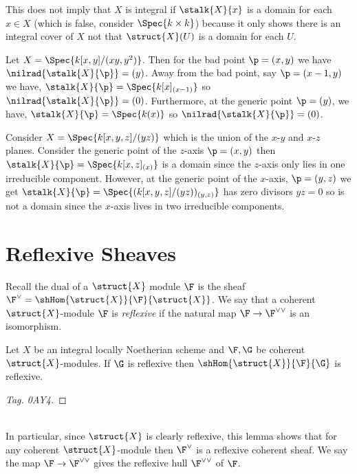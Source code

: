 \documentclass[12pt]{article}
\begin{document}
\begin{rmk}
This does not imply that $X$ is integral if $\stalk{X}{x}$ is a domain for each $x \in X$ (which is false, consider $\Spec{k \times k}$) because it only shows there is an integral cover of $X$ not that $\struct{X}(U)$ is a domain for each $U$. 
\end{rmk}

\begin{example}
Let $X = \Spec{k[x,y]/(xy, y^2)}$. Then for the bad point $\p = (x, y)$ we have $\nilrad{\stalk{X}{\p}} = (y)$. Away from the bad point, say $\p = (x - 1, y)$ we have, $\stalk{X}{\p} = \Spec{k[x]_{(x-1)}}$ so $\nilrad{\stalk{X}{\p}} = (0)$. Furthermore, at the generic point $\p = (y)$, we have, $\stalk{X}{\p} = \Spec{k(x)}$ so $\nilrad{\stalk{X}{\p}} = (0)$. 
\end{example}

\begin{example}
Consider $X = \Spec{k[x,y,z]/(yz)}$ which is the union of the $x$-$y$ and $x$-$z$ planes. Consider the generic point of the $z$-axis $\p = (x, y)$ then $\stalk{X}{\p} = \Spec{k[x, z]_{(x)}}$ is a domain since the $z$-axis only lies in one irreducible component. However, at the generic point of the $x$-axis, $\p = (y, z)$ we get $\stalk{X}{\p} = \Spec{(k[x, y, z]/(yz))_{(y, z)}}$ has zero divisors $yz = 0$ so is not a domain since the $x$-axis lives in two irreducible components.
\end{example}

\section{Reflexive Sheaves}

\newcommand{\RPic}[1]{\mathrm{RPic}\left( #1 \right)}
\renewcommand{\R}{\mathcal{R}}

\begin{defn}
Recall the dual of a $\struct{X}$ module $\F$ is the sheaf $\F^\vee = \shHom{\struct{X}}{\F}{\struct{X}}$. We say that a coherent $\struct{X}$-module $\F$ is \textit{reflexive} if the natural map $\F \to \F^{\vee \vee}$ is an isomorphism. 
\end{defn}

\begin{lemma}
Let $X$ be an integral locally Noetherian scheme and $\F, \G$ be coherent $\struct{X}$-modules. If $\G$ is reflexive then $\shHom{\struct{X}}{\F}{\G}$ is reflexive.
\end{lemma}

\begin{proof}
[Tag. 0AY4]
\end{proof}
\noindent\\
In particular, since $\struct{X}$ is clearly reflexive, this lemma shows that for any coherent $\struct{X}$-module then $\F^\vee$ is a reflexive coherent sheaf. We say the map $\F \to \F^{\vee \vee}$ gives the reflexive hull $\F^{\vee \vee}$ of $\F$.
\end{document}
